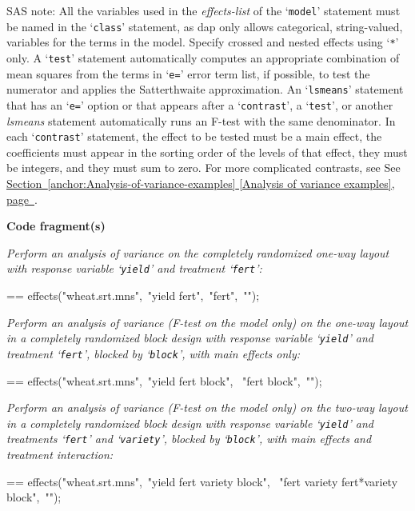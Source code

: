 \documentclass{book}
\makeatletter
\newcommand\Texinfocommandstyletextvar[1]{{\normalfont{}\textsl{#1}}}%
\newenvironment{Texinfopreformatted}{%
  \par\GNUTobeylines\obeyspaces\frenchspacing\parskip=\z@\parindent=\z@}{}
{\catcode`\^^M=13 \gdef\GNUTobeylines{\catcode`\^^M=13 \def^^M{\null\par}}}
\newenvironment{Texinfoindented}{\begin{list}{}{}\item\relax}{\end{list}}
\renewcommand{\_}{\Texinfounderscore\discretionary{}{}{}}
\makeatother
\begin{document}
SAS note: All the variables used in the \Texinfocommandstyletextvar{effects-list} of the `\texttt{model}'
statement must be named in the `\texttt{class}' statement, as dap only
allows categorical, string-valued, variables for the terms in the model.
Specify crossed and nested effects using `\texttt{*}' only.
A `\texttt{test}' statement automatically computes an appropriate combination of mean
squares from the terms in `\texttt{e=}' error term list, if possible, to test the numerator and
applies the Satterthwaite approximation.
An `\texttt{lsmeans}' statement that has an `\texttt{e=}' option or that appears after
a `\texttt{contrast}', a `\texttt{test}', or another \Texinfocommandstyletextvar{lsmeans} statement
automatically runs an F-test with the same denominator.
In each `\texttt{contrast}' statement, the effect to be tested must be a main effect,
the coefficients must appear in the sorting order of the
levels of that effect, they must be integers, and they must sum to zero.
For more complicated contrasts, see See \hyperref[anchor:Analysis-of-variance-examples]{Section~\ref*{anchor:Analysis-of-variance-examples} [Analysis of variance examples], page~\pageref*{anchor:Analysis-of-variance-examples}}.

\noindent{}\textbf{Code fragment(s)}

\emph{Perform an analysis of variance on the completely randomized
one-way layout with
response variable `\texttt{yield}' and treatment `\texttt{fert}':}
\begin{Texinfoindented}
\begin{Texinfopreformatted}%
\ttfamily effects("wheat.srt.mns",\ "yield fert",\ "fert",\ "");
\end{Texinfopreformatted}
\end{Texinfoindented}

\emph{Perform an analysis of variance (F-test on the model only)
on the one-way layout in a completely randomized block design with
response variable `\texttt{yield}' and treatment `\texttt{fert}',
blocked by `\texttt{block}', with main effects only:}
\begin{Texinfoindented}
\begin{Texinfopreformatted}%
\ttfamily effects("wheat.srt.mns",\ "yield fert block",
\                 "fert block",\ "");
\end{Texinfopreformatted}
\end{Texinfoindented}

\emph{Perform an analysis of variance (F-test on the model only)
on the two-way layout in a completely randomized block design with
response variable `\texttt{yield}' and treatments `\texttt{fert}' and
`\texttt{variety}', blocked by `\texttt{block}', with main effects
and treatment interaction:}
\begin{Texinfoindented}
\begin{Texinfopreformatted}%
\ttfamily effects("wheat.srt.mns",\ "yield fert variety block",
\                 "fert variety fert*variety block",\ "");
\end{Texinfopreformatted}
\end{Texinfoindented}
\end{document}
